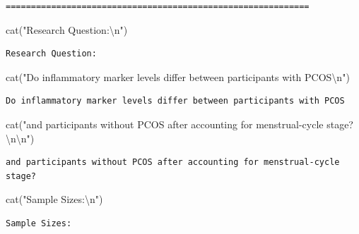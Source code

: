 \documentclass[
  letterpaper,
  DIV=11,
  numbers=noendperiod]{scrartcl}
\newenvironment{Shaded}{\begin{snugshade}}{\end{snugshade}}
\newcommand{\FunctionTok}[1]{\textcolor[rgb]{0.28,0.35,0.67}{#1}}
\newcommand{\NormalTok}[1]{\textcolor[rgb]{0.00,0.23,0.31}{#1}}
\newcommand{\SpecialCharTok}[1]{\textcolor[rgb]{0.37,0.37,0.37}{#1}}
\newcommand{\StringTok}[1]{\textcolor[rgb]{0.13,0.47,0.30}{#1}}
\begin{document}
\begin{verbatim}
============================================================
\end{verbatim}

\begin{Shaded}
\begin{Highlighting}[]
\FunctionTok{cat}\NormalTok{(}\StringTok{"Research Question:}\SpecialCharTok{\textbackslash{}n}\StringTok{"}\NormalTok{)}
\end{Highlighting}
\end{Shaded}

\begin{verbatim}
Research Question:
\end{verbatim}

\begin{Shaded}
\begin{Highlighting}[]
\FunctionTok{cat}\NormalTok{(}\StringTok{"Do inflammatory marker levels differ between participants with PCOS}\SpecialCharTok{\textbackslash{}n}\StringTok{"}\NormalTok{)}
\end{Highlighting}
\end{Shaded}

\begin{verbatim}
Do inflammatory marker levels differ between participants with PCOS
\end{verbatim}

\begin{Shaded}
\begin{Highlighting}[]
\FunctionTok{cat}\NormalTok{(}\StringTok{"and participants without PCOS after accounting for menstrual{-}cycle stage?}\SpecialCharTok{\textbackslash{}n\textbackslash{}n}\StringTok{"}\NormalTok{)}
\end{Highlighting}
\end{Shaded}

\begin{verbatim}
and participants without PCOS after accounting for menstrual-cycle stage?
\end{verbatim}

\begin{Shaded}
\begin{Highlighting}[]
\FunctionTok{cat}\NormalTok{(}\StringTok{"Sample Sizes:}\SpecialCharTok{\textbackslash{}n}\StringTok{"}\NormalTok{)}
\end{Highlighting}
\end{Shaded}

\begin{verbatim}
Sample Sizes:
\end{verbatim}
\end{document}
